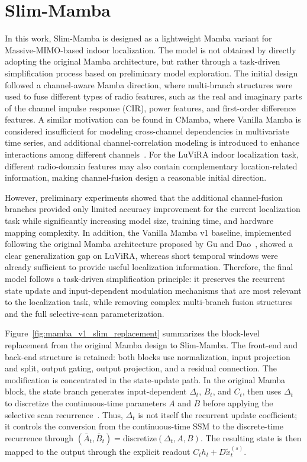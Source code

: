 \documentclass[11pt,twoside]{eitExjobb}
\begin{document}
\section{Slim-Mamba}
\label{sec:slim_mamba}
In this work, Slim-Mamba is designed as a lightweight Mamba variant for
Massive-MIMO-based indoor localization. The model is not obtained by directly adopting
the original Mamba architecture, but rather through a task-driven simplification
process based on preliminary model exploration. The initial design followed a
channel-aware Mamba direction, where multi-branch structures were used to fuse
different types of radio features, such as the real and imaginary parts of the channel
impulse response (CIR), power features, and first-order difference features. A similar
motivation can be found in CMamba, where Vanilla Mamba is considered insufficient for
modeling cross-channel dependencies in multivariate time series, and additional
channel-correlation modeling is introduced to enhance interactions among different
channels~\cite{cite:CMamba2024}. For the LuViRA indoor localization task, different
radio-domain features may also contain complementary location-related information,
making channel-fusion design a reasonable initial direction.

However, preliminary experiments showed that the additional channel-fusion branches
provided only limited accuracy improvement for the current localization task while
significantly increasing model size, training time, and hardware mapping complexity. In
addition, the Vanilla Mamba v1 baseline, implemented following the original Mamba
architecture proposed by Gu and Dao~\cite{cite:Mamba2023}, showed a clear
generalization gap on LuViRA, whereas short temporal windows were already sufficient to
provide useful localization information. Therefore, the final model follows a
task-driven simplification principle: it preserves the recurrent state update and
input-dependent modulation mechanisms that are most relevant to the localization task,
while removing complex multi-branch fusion structures and the full selective-scan
parameterization.

Figure~\ref{fig:mamba_v1_slim_replacement} summarizes the block-level replacement from
the original Mamba design to Slim-Mamba. The front-end and back-end structure is
retained: both blocks use normalization, input projection and split, output gating,
output projection, and a residual connection. The modification is concentrated in the
state-update path. In the original Mamba block, the state branch generates
input-dependent \(\Delta_t\), \(B_t\), and \(C_t\), then uses \(\Delta_t\) to
discretize the continuous-time parameters \(A\) and \(B\) before applying the
selective scan recurrence~\cite{cite:Mamba2023}. Thus, \(\Delta_t\) is not itself the
recurrent update coefficient; it controls the conversion from the continuous-time SSM
to the discrete-time recurrence through
\((\bar{A}_t,\bar{B}_t)=\mathrm{discretize}(\Delta_t,A,B)\). The resulting state is
then mapped to the output through the explicit readout
\(C_t h_t + D\tilde{x}^{(s)}_t\).
\end{document}
